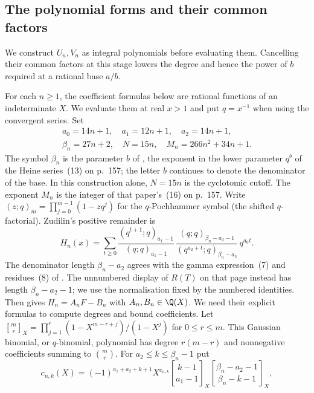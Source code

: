 \subsection{The polynomial forms and their common factors}\label{long1049:sec:source-forms}

We construct $U_n,V_n$ as integral polynomials before evaluating
them. Cancelling their common factors at this stage lowers the degree
and hence the power of $b$ required at a rational base $a/b$.

For each $n\ge1$, the coefficient formulas below are rational functions
of an indeterminate $X$. We evaluate them at real $x>1$ and put $q=x^{-1}$
when using the convergent series. Set
\[
\begin{gathered}
 a_0=14n+1,\quad a_1=12n+1,\quad a_2=14n+1,\\
 \beta_n=27n+2,\quad N=15n,\quad M_n=266n^{2}+34n+1 .
\end{gathered}
\]
The symbol $\beta_n$ is the parameter $b$ of \cite[Sec.~3, p.~155]{zudilin2004},
the exponent in the lower parameter $q^{b}$ of the Heine series~(13) on p.~157;
the letter $b$ continues to
denote the denominator of the base. In this construction alone,
$N=15n$ is the cyclotomic cutoff. The exponent $M_n$ is the integer
of that paper's~(16) on p.~157. Write
$(z;q)_m=\prod_{j=0}^{m-1}(1-zq^{j})$ for the $q$-Pochhammer symbol
(the shifted $q$-factorial). Zudilin's positive remainder is
\begin{equation}\label{long1049:eq:positive-source-form}
 H_n(x)=\sum_{t\ge0}
 \frac{(q^{t+1};q)_{a_1-1}}{(q;q)_{a_1-1}}\,
 \frac{(q;q)_{\beta_n-a_2-1}}{(q^{a_2+t};q)_{\beta_n-a_2}}\,q^{a_0t}.
\end{equation}
The denominator length $\beta_n-a_2$ agrees with the gamma
expression~(7) and residues~(8) of \cite[p.~156]{zudilin2004}.
The unnumbered display of $R(T)$ on that page instead has length
$\beta_n-a_2-1$; we use the normalisation fixed by the numbered identities.
Then \cite[(8)--(11), pp.~156--157]{zudilin2004} gives $H_n=A_nF-B_n$ with
$A_n,B_n\in\Q(X)$. We need their explicit formulas to compute degrees
and bound coefficients. Let
$\genfrac{[}{]}{0pt}{}{m}{r}_X=\prod_{j=1}^{r}(1-X^{m-r+j})/(1-X^j)$
for $0\le r\le m$. This Gaussian binomial, or $q$-binomial, polynomial has degree
$r(m-r)$ and nonnegative coefficients summing to $\binom{m}{r}$. For
$a_2\le k\le\beta_n-1$ put
\begin{equation}\label{long1049:eq:c-explicit}
 c_{n,k}(X)=(-1)^{a_1+a_2+k+1}X^{e_{n,k}}
 \genfrac{[}{]}{0pt}{}{k-1}{a_1-1}_X
 \genfrac{[}{]}{0pt}{}{\beta_n-a_2-1}{\beta_n-k-1}_X,
\end{equation}
